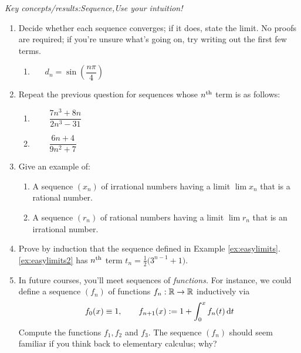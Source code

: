 

\begin{exercises}{}{}
	\emph{Key concepts/results:\quad Sequence,\quad Use your intuition!}
	
	\begin{enumerate}
	  \item%
	  Decide whether each sequence converges; if it does, state the limit. No proofs are required; if you're unsure what's going on, try writing out the first few terms.
		\begin{enumerate}
	    \item {}\ 
	    \ 
	    \ 
	    $d_n=\sin\left(\dfrac{n\pi}4\right)$
	  \end{enumerate}

	  
	  \item Repeat the previous question for sequences whose $n\textsuperscript{th}$ term is as follows:
	  \begin{enumerate}
	    \item {}\ 
	    \ 
	    \ 
	    \
			$\dfrac{7n^3+8n}{2n^3-31}$
	    \setcounter{enumii}{5}
	    \item {}\ 
	    \ 
	    \ 
	    \ 
	    $\dfrac{6n+4}{9n^2+7}$
	  \end{enumerate}

	  
	  \item Give an example of:
	  \begin{enumerate}
		  \item A sequence $(x_n)$ of irrational numbers having a limit $\lim x_n$ that is a rational number.
		  \item A sequence $(r_n)$ of rational numbers having a limit $\lim r_n$ that is an irrational number.
	  \end{enumerate}
	  
	  
	  \item Prove by induction that the sequence defined in Example \ref*{ex:easylimits}.\ref{ex:easylimits2} has $n\textsuperscript{th}$ term $t_n=\frac 12\bigl(3^{n-1}+1\bigr)$.
	  
	  
	  \item In future courses, you'll meet sequences of \emph{functions.} For instance,  we could define a sequence $(f_n)$ of functions $f_n:\mathbb{R}\to\mathbb{R}$ inductively via
	  \[
	  	f_0(x)\equiv 1,\qquad f_{n+1}(x):=1+\int_0^x f_n(t)\,{\mathrm{d} t}
	  \]
	  Compute the functions $f_1,f_2$ and $f_3$. The sequence $(f_n)$ should seem familiar if you think back to elementary calculus; why?
	\end{enumerate}
\end{exercises}


